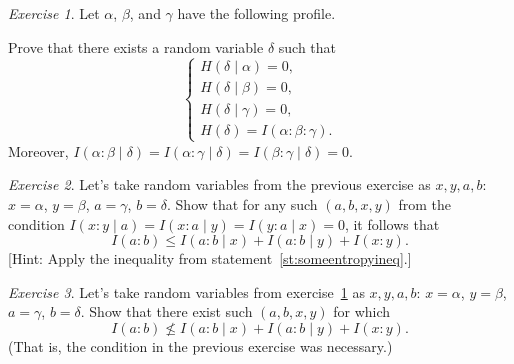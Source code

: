 \documentclass[12pt,sans]{article}
\theoremstyle{definition}
\theoremstyle{plain}
\theoremstyle{remark}
\newtheorem{exercise}{Exercise}[section]
\begin{document}
\begin{exercise}\label{ex:existsdelta}
    Let \(\alpha\), \(\beta\), and \(\gamma\) have the following profile.
    \begin{center}
    \end{center}
    Prove that there exists a random variable \(\delta\) such that
    \[
        \begin{cases}
            H(\delta \mid \alpha) = 0,\\
            H(\delta \mid \beta)  = 0,\\
            H(\delta \mid \gamma) = 0,\\
            H(\delta) = I(\alpha : \beta : \gamma).
        \end{cases}
    \]
    Moreover, \(I(\alpha : \beta \mid \delta) = I(\alpha : \gamma \mid \delta) = I(\beta : \gamma \mid \delta) = 0\).
\end{exercise}
\begin{exercise}
    Let’s take random variables from the previous exercise as \(x, y, a, b\): \(x = \alpha\),
    \(y = \beta\), \(a = \gamma\), \(b = \delta\). Show that for any such \((a, b, x, y)\) from the condition
    \(I(x : y \mid a) = I(x : a \mid y) = I(y : a \mid x) = 0\), it follows that
    \[
        I(a : b) \le I(a : b \mid x) + I(a : b \mid y) + I(x : y).
    \]
    [Hint: Apply the inequality from statement~\ref{st:someentropyineq}.]
\end{exercise}
\begin{exercise}
    Let’s take random variables from exercise~\ref{ex:existsdelta} as \(x, y, a, b\): \(x = \alpha\),
    \(y = \beta\), \(a = \gamma\), \(b = \delta\). Show that there exist such \((a, b, x, y)\) for which
    \[
        I(a : b) \not\le I(a : b \mid x) + I(a : b \mid y) + I(x : y).
    \]
    (That is, the condition in the previous exercise was necessary.)
\end{exercise}
\end{document}
